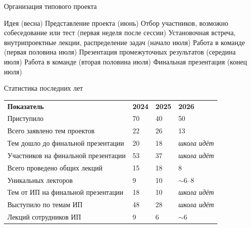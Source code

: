 \documentclass[xetex,mathserif,serif,aspectratio=1610]{beamer}
\begin{document}
    \begin{frame}{Организация типового проекта}
        \begin{outline}
            \1 Идея (весна)
            \1 Представление проекта (июнь)
            \1 Отбор участников, возможно собеседование или тест (первая неделя после сессии)
            \1 Установочная встреча, внутрипроектные лекции, распределение задач (начало июля)
            \1 Работа в команде (первая половина июля)
            \1 Презентация промежуточных результатов (середина июля)
            \1 Работа в команде (вторая половина июля)
            \1 Финальная презентация (конец июля)
        \end{outline}
    \end{frame}

    \begin{frame}{Статистика последних лет}
        \begin{tabu} to \textwidth {X[4,l] X[1,c] X[1,c] X[2,c]}
            \textbf{Показатель} & \textbf{2024} & \textbf{2025} & \textbf{2026} \\
            Приступило & 70  & 40  & 50 \\
            Всего заявлено тем проектов & 22  & 26  & 13 \\
            Тем дошло до финальной презентации & 20  & 18  & \textit{школа идёт} \\
            Участников на финальной презентации & 53  & 37  & \textit{школа идёт} \\
            Всего проведено общих лекций & 15  & 18  & 8 \\
            Уникальных лекторов & 9   & 10  & $\sim$6--8 \\
            Тем от ИП на финальной презентации & 18  & 10  & \textit{школа идёт} \\
            Выступило по темам ИП & 48  & 28  & \textit{школа идёт} \\
            Лекций сотрудников ИП & 9   & 6   & $\sim$6 \\
        \end{tabu}
    \end{frame}
\end{document}
